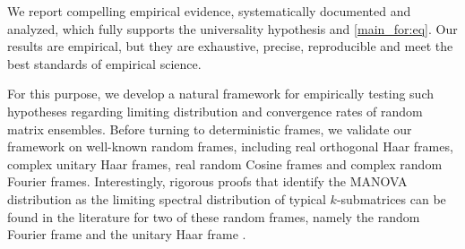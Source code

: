 \documentclass[a4paper,12pt]{article}
\newcommand{\TODO}[1]{ {\tt \color{red} [TODO:#1] } }
\newcommand{\E}{\ensuremath{\mathbb{E}}}
\newcommand{\specstat}{\ensuremath{\Psi}}
\newcommand{\Gk}{\ensuremath{G_K}}
\begin{document}
We report
compelling empirical evidence,  systematically documented and 
analyzed,
which fully supports the universality hypothesis and \eqref{main_for:eq}.
Our results are empirical, but they are exhaustive, 
precise, reproducible and meet the best standards 
of empirical science. 

For this purpose, we develop a natural
framework for empirically testing such hypotheses regarding
limiting distribution and convergence rates of 
random matrix ensembles. 
Before turning to deterministic frames, 
we validate our framework on well-known random frames, including 
real orthogonal Haar frames, complex unitary Haar frames, real random
Cosine frames and complex random Fourier frames.
Interestingly, rigorous proofs that identify the MANOVA distribution as the
limiting spectral distribution of typical $k$-submatrices can be found in the
literature for two of these random frames, namely the random Fourier frame
\cite{Farrell} and the unitary Haar frame \cite{Edelman}. 







%




\end{document}
